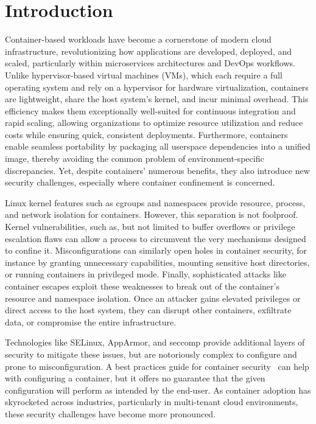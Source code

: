 \section{Introduction}

Container-based workloads have become a cornerstone of modern cloud infrastructure, revolutionizing how applications are developed, deployed, and scaled, particularly within microservices architectures and DevOps workflows. Unlike hypervisor-based virtual machines (VMs), which each require a full operating system and rely on a hypervisor for hardware virtualization, containers are lightweight, share the host system’s kernel, and incur minimal overhead. This efficiency makes them exceptionally well-suited for continuous integration and rapid scaling, allowing organizations to optimize resource utilization and reduce costs while ensuring quick, consistent deployments. Furthermore, containers enable seamless portability by packaging all userspace dependencies into a unified image, thereby avoiding the common problem of environment-specific discrepancies. Yet, despite containers’ numerous benefits, they also introduce new security challenges, especially where container confinement is concerned.

Linux kernel features such as cgroups and namespaces provide resource, process, and network isolation for containers. However, this separation is not foolproof. Kernel vulnerabilities, such as, but not limited to buffer overflows or privilege escalation flaws can allow a process to circumvent the very mechanisms designed to confine it. Misconfigurations can similarly open holes in container security, for instance by granting unnecessary capabilities, mounting sensitive host directories, or running containers in privileged mode. Finally, sophisticated attacks like container escapes exploit these weaknesses to break out of the container’s resource and namespace isolation. Once an attacker gains elevated privileges or direct access to the host system, they can disrupt other containers, exfiltrate data, or compromise the entire infrastructure. 

Technologies like SELinux, AppArmor, and seccomp provide additional layers of security to mitigate these issues, but are notoriously complex to configure and prone to misconfiguration. A best practices guide for container security~\cite{CIS} can help with configuring a container, but it offers no guarantee that the given configuration will perform as intended by the end-user. As container adoption has skyrocketed across industries, particularly in multi-tenant cloud environments, these security challenges have become more pronounced.

